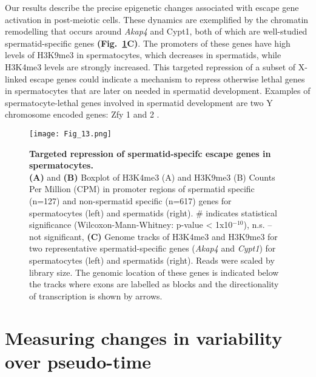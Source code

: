 Our results describe the precise epigenetic changes associated with escape gene activation in post-meiotic cells. 
These dynamics are exemplified by the chromatin remodelling that occurs around \textit{Akap4} and \gls{Cypt1}, both of which are well-studied spermatid-specific genes \textbf{(Fig.~\ref{fig3:K9_K4_targeted}C)}. 
The promoters of these genes have high levels of H3K9me3 in spermatocytes, which decreases in spermatids, while H3K4me3 levels are strongly increased. 
This targeted repression of a subset of X-linked escape genes could indicate a mechanism to repress otherwise lethal genes in spermatocytes that are later on needed in spermatid development. 
Examples of spermatocyte-lethal genes involved in spermatid development are two Y chromosome encoded genes: \gls{Zfy} 1 and 2 \citep{Royo2010}.

\newpage

\begin{figure}[!h]
\centering
\texttt{[image: Fig\_13.png]}
\caption[Targeted repression of spermatid-specifc escape genes in spermatocytes]{\textbf{Targeted repression of spermatid-specifc escape genes in spermatocytes.} \\
\textbf{(A)} and \textbf{(B)} Boxplot of H3K4me3 (A) and H3K9me3 (B) Counts Per Million (CPM) in promoter regions of spermatid specific (n=127) and non-spermatid specific (n=617) genes for spermatocytes (left) and spermatids (right).  
\# indicates statistical significance (Wilcoxon-Mann-Whitney: p-value < 1x10$^{-10}$), n.s. – not significant, 
\textbf{(C)} Genome tracks of H3K4me3 and H3K9me3 for two representative spermatid-specific genes (\textit{Akap4} and \textit{Cypt1}) for spermatocytes (left) and spermatids (right). 
Reads were scaled by library size. The genomic location of these genes is indicated below the tracks where exons are labelled as blocks and the directionality of transcription is shown by arrows.}
\label{fig3:K9_K4_targeted}
\end{figure}

\newpage

\section{Measuring changes in variability over pseudo-time}
\label{sec3:variability_over_PT}

